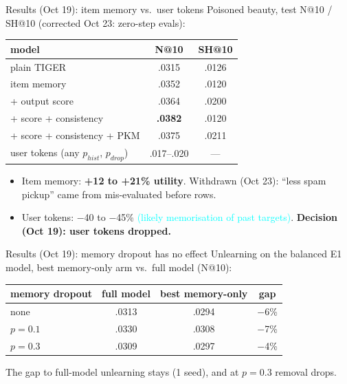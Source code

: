 \documentclass{beamer}
\newcommand{\pierre}[1]{\textcolor{cyan}{#1}}
\begin{document}
\begin{frame}{Results (Oct 19): item memory vs.\ user tokens}
Poisoned beauty, test N@10 / SH@10 (\alert{corrected Oct 23}: zero-step evals):
\begin{center}
\small
\begin{tabular}{|l|c|c|}
\hline
model & N@10 & SH@10 \\
\hline
plain TIGER                         & .0315 & .0126 \\
item memory                         & .0352 & .0120 \\
\quad + output score               & .0364 & .0200 \\
\quad + score + consistency        & \textbf{.0382} & .0120 \\
\quad + score + consistency + PKM  & .0375 & .0211 \\
\hline
user tokens (any $p_{hist}$, $p_{drop}$) & \alert{.017--.020} & --- \\
\hline
\end{tabular}
\end{center}
\begin{itemize}
  \item Item memory: \textbf{+12 to +21\% utility}. \alert{Withdrawn (Oct 23):}
        ``less spam pickup'' came from mis-evaluated before rows.
  \item User tokens: $-$40 to $-$45\% \pierre{(likely memorisation of past
        targets)}. \textbf{Decision (Oct 19): user tokens dropped.}
\end{itemize}
\end{frame}

\begin{frame}{Results (Oct 19): memory dropout has no effect}
Unlearning on the balanced E1 model, best memory-only arm vs.\ full model (N@10):
\begin{center}
\small
\begin{tabular}{|l|c|c|c|}
\hline
memory dropout & full model & best memory-only & gap \\
\hline
none   & .0313 & .0294 & $-$6\% \\
$p=0.1$ & .0330 & .0308 & $-$7\% \\
$p=0.3$ & .0309 & .0297 & $-$4\% \\
\hline
\end{tabular}
\end{center}
The gap to full-model unlearning stays (1 seed), and at $p=0.3$ removal drops.
\end{frame}
\end{document}
